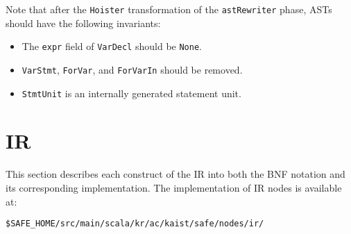 Note that after the \verb!Hoister! transformation of the \verb!astRewriter! phase,
ASTs should have the following invariants:
\begin{itemize}
\item The {\tt expr} field of {\tt VarDecl} should be {\tt None}.
\item {\tt VarStmt}, {\tt ForVar}, and {\tt ForVarIn} should be removed.
\item {\tt StmtUnit} is an internally generated statement unit.
\end{itemize}

\section{IR}
This section describes each construct of the \safe IR
into both the BNF notation and its corresponding implementation.
The implementation of IR nodes is available at:
\begin{verbatim}
$SAFE_HOME/src/main/scala/kr/ac/kaist/safe/nodes/ir/
\end{verbatim}
\small
